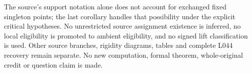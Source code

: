 \documentclass[11pt,a4paper]{article}
\begin{document}
The source's support notation alone does not account for exchanged
fixed singleton points; the last corollary handles that possibility
under the explicit critical hypotheses. No unrestricted source
assignment existence is inferred, no local eligibility is promoted
to ambient eligibility, and no signed lift classification is used.
Other source branches, rigidity diagrams, tables and complete L044
recovery remain separate. No new computation, formal theorem,
whole-original credit or question claim is made.
\end{document}
